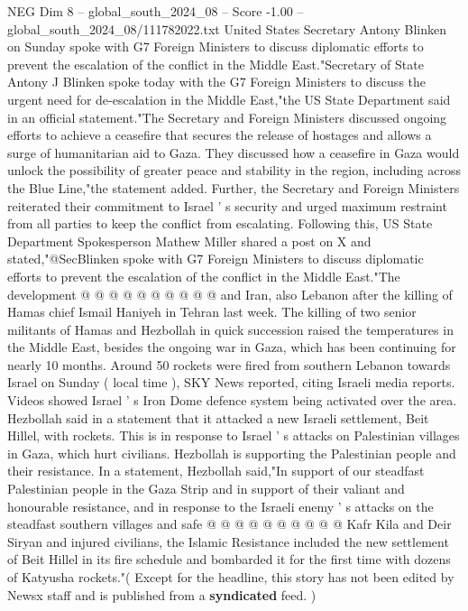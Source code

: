 \begin{textsample}{NEG Dim 8 – global\_south\_2024\_08 – Score -1.00 – global\_south\_2024\_08/111782022.txt}  \label{ex:f8_neg_077}
United States Secretary Antony Blinken on Sunday spoke with G7 Foreign Ministers to discuss diplomatic efforts to prevent the escalation of the conflict in the Middle East."Secretary of State Antony J Blinken spoke today with the G7 Foreign Ministers to discuss the urgent need for de-escalation in the Middle East,"the US State Department said in an official statement."The Secretary and Foreign Ministers discussed ongoing efforts to achieve a ceasefire that secures the release of hostages and allows a surge of humanitarian aid to Gaza.
They discussed how a ceasefire in Gaza would unlock the possibility of greater peace and stability in the region, including across the Blue Line,"the statement added.
Further, the Secretary and Foreign Ministers reiterated their commitment to Israel ' s security and urged maximum restraint from all parties to keep the conflict from escalating.
Following this, US State Department Spokesperson Mathew Miller shared a post on X and stated,"@SecBlinken spoke with G7 Foreign Ministers to discuss diplomatic efforts to prevent the escalation of the conflict in the Middle East."The development @ @ @ @ @ @ @ @ @ @ and Iran, also Lebanon after the killing of Hamas chief Ismail Haniyeh in Tehran last week.
The killing of two senior militants of Hamas and Hezbollah in quick succession raised the temperatures in the Middle East, besides the ongoing war in Gaza, which has been continuing for nearly 10 months.
Around 50 rockets were fired from southern Lebanon towards Israel on Sunday ( local time ), SKY News reported, citing Israeli media reports.
Videos showed Israel ' s Iron Dome defence system being activated over the area.
Hezbollah said in a statement that it attacked a new Israeli settlement, Beit Hillel, with rockets.
This is in response to Israel ' s attacks on Palestinian villages in Gaza, which hurt civilians.
Hezbollah is supporting the Palestinian people and their resistance.
In a statement, Hezbollah said,"In support of our steadfast Palestinian people in the Gaza Strip and in support of their valiant and honourable resistance, and in response to the Israeli enemy ' s attacks on the steadfast southern villages and safe @ @ @ @ @ @ @ @ @ @ Kafr Kila and Deir Siryan and injured civilians, the Islamic Resistance included the new settlement of Beit Hillel in its fire schedule and bombarded it for the first time with dozens of Katyusha rockets."( Except for the headline, this story has not been edited by Newsx staff and is published from a \textbf{syndicated} feed. )

\end{textsample}
